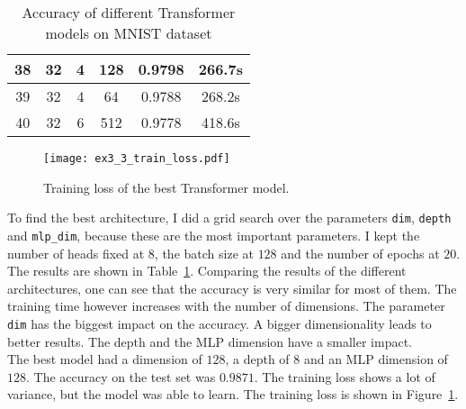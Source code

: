 \begin{table}[htbp]
\begin{center}
\begin{tabular}{|c|c|c|c|c|c|}
      \hline
      38            & 32                    & 4                       & 128                        & 0.9798                     & 266.7s                      \\
      \hline
      39            & 32                    & 4                       & 64                         & 0.9788                     & 268.2s                      \\
      \hline
      40            & 32                    & 6                       & 512                        & 0.9778                     & 418.6s                      \\
      \hline
    \end{tabular}
  \end{center}
  \caption{Accuracy of different Transformer models on MNIST dataset}
  \label{tab:transformer_accuracy}
\end{table}

\begin{figure}
  \centering
  \texttt{[image: ex3\_3\_train\_loss.pdf]}
  \caption{Training loss of the best Transformer model.}
  \label{fig:ex3_3_train_loss}
\end{figure}

To find the best architecture, I did a grid search over the parameters \texttt{dim}, \texttt{depth}
and \texttt{mlp\_dim}, because these are the most important parameters. I kept the number of heads
fixed at $8$, the batch size at $128$ and the number of epochs at $20$. The results are shown in
Table~\ref{tab:transformer_accuracy}. Comparing the results of the different architectures, one can
see that the accuracy is very similar for most of them. The training time however increases with the
number of dimensions. The parameter \texttt{dim} has the biggest impact on the accuracy. A bigger
dimensionality leads to better results. The depth and the MLP dimension have a smaller impact.\\
The best model had a dimension of $128$, a depth of $8$ and an MLP dimension of $128$. The accuracy
on the test set was $0.9871$. The training loss shows a lot of variance, but the model was able to
learn. The training loss is shown in Figure~\ref{fig:ex3_3_train_loss}.

